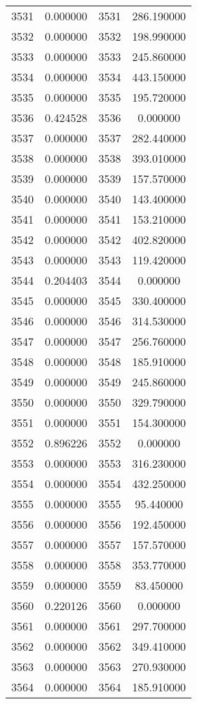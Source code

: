 \documentclass[12pt]{article}
\begin{document}
\begin{longtable}{@{}cccc@{}}
3531 & 0.000000 & 3531 & 286.190000 \\
3532 & 0.000000 & 3532 & 198.990000 \\
3533 & 0.000000 & 3533 & 245.860000 \\
3534 & 0.000000 & 3534 & 443.150000 \\
3535 & 0.000000 & 3535 & 195.720000 \\
3536 & 0.424528 & 3536 & 0.000000 \\
3537 & 0.000000 & 3537 & 282.440000 \\
3538 & 0.000000 & 3538 & 393.010000 \\
3539 & 0.000000 & 3539 & 157.570000 \\
3540 & 0.000000 & 3540 & 143.400000 \\
3541 & 0.000000 & 3541 & 153.210000 \\
3542 & 0.000000 & 3542 & 402.820000 \\
3543 & 0.000000 & 3543 & 119.420000 \\
3544 & 0.204403 & 3544 & 0.000000 \\
3545 & 0.000000 & 3545 & 330.400000 \\
3546 & 0.000000 & 3546 & 314.530000 \\
3547 & 0.000000 & 3547 & 256.760000 \\
3548 & 0.000000 & 3548 & 185.910000 \\
3549 & 0.000000 & 3549 & 245.860000 \\
3550 & 0.000000 & 3550 & 329.790000 \\
3551 & 0.000000 & 3551 & 154.300000 \\
3552 & 0.896226 & 3552 & 0.000000 \\
3553 & 0.000000 & 3553 & 316.230000 \\
3554 & 0.000000 & 3554 & 432.250000 \\
3555 & 0.000000 & 3555 & 95.440000 \\
3556 & 0.000000 & 3556 & 192.450000 \\
3557 & 0.000000 & 3557 & 157.570000 \\
3558 & 0.000000 & 3558 & 353.770000 \\
3559 & 0.000000 & 3559 & 83.450000 \\
3560 & 0.220126 & 3560 & 0.000000 \\
3561 & 0.000000 & 3561 & 297.700000 \\
3562 & 0.000000 & 3562 & 349.410000 \\
3563 & 0.000000 & 3563 & 270.930000 \\
3564 & 0.000000 & 3564 & 185.910000 \\

\end{longtable}
\end{document}
